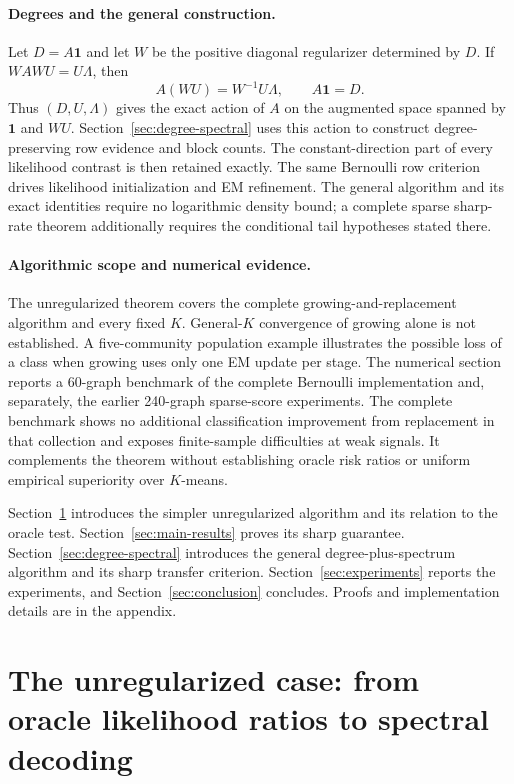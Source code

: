 \documentclass[11pt]{article}
\theoremstyle{definition}
\theoremstyle{remark}
\numberwithin{equation}{section}
\begin{document}
\paragraph{Degrees and the general construction.}
Let $D=A\mathbf1$ and let $W$ be the positive diagonal regularizer determined by $D$. If $WAWU=U\Lambda$, then
\[
 A(WU)=W^{-1}U\Lambda,\qquad A\mathbf1=D.
\]
Thus $(D,U,\Lambda)$ gives the exact action of $A$ on the augmented space spanned by $\mathbf1$ and $WU$. Section~\ref{sec:degree-spectral} uses this action to construct degree-preserving row evidence and block counts. The constant-direction part of every likelihood contrast is then retained exactly. The same Bernoulli row criterion drives likelihood initialization and EM refinement. The general algorithm and its exact identities require no logarithmic density bound; a complete sparse sharp-rate theorem additionally requires the conditional tail hypotheses stated there.

\paragraph{Algorithmic scope and numerical evidence.}
The unregularized theorem covers the complete growing-and-replacement algorithm and every fixed $K$. General-$K$ convergence of growing alone is not established. A five-community population example illustrates the possible loss of a class when growing uses only one EM update per stage. The numerical section reports a 60-graph benchmark of the complete Bernoulli implementation and, separately, the earlier 240-graph sparse-score experiments. The complete benchmark shows no additional classification improvement from replacement in that collection and exposes finite-sample difficulties at weak signals. It complements the theorem without establishing oracle risk ratios or uniform empirical superiority over $K$-means.

Section~\ref{sec:algorithm} introduces the simpler unregularized algorithm and its relation to the oracle test. Section~\ref{sec:main-results} proves its sharp guarantee. Section~\ref{sec:degree-spectral} introduces the general degree-plus-spectrum algorithm and its sharp transfer criterion. Section~\ref{sec:experiments} reports the experiments, and Section~\ref{sec:conclusion} concludes. Proofs and implementation details are in the appendix.

\section{The unregularized case: from oracle likelihood ratios to spectral decoding}
\label{sec:algorithm}
\end{document}
